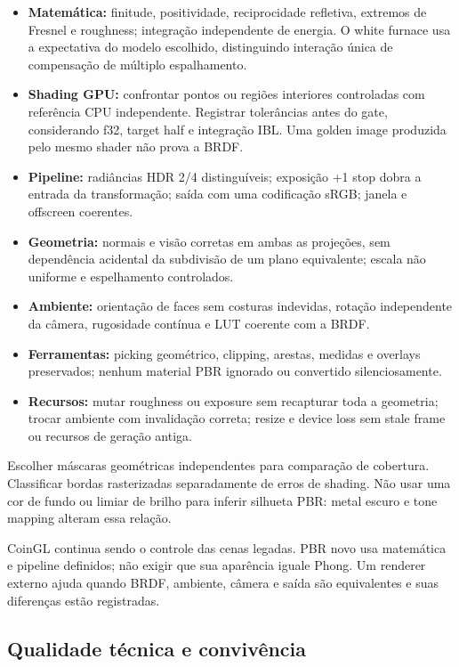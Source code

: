 \documentclass[11pt,a4paper]{article}
\begin{document}
\begin{itemize}
\item \textbf{Matemática:} finitude, positividade, reciprocidade refletiva, extremos de Fresnel e roughness; integração independente de energia. O white furnace usa a expectativa do modelo escolhido, distinguindo interação única de compensação de múltiplo espalhamento.
\item \textbf{Shading GPU:} confrontar pontos ou regiões interiores controladas com referência CPU independente. Registrar tolerâncias antes do gate, considerando f32, target half e integração IBL. Uma golden image produzida pelo mesmo shader não prova a BRDF.
\item \textbf{Pipeline:} radiâncias HDR 2/4 distinguíveis; exposição +1 stop dobra a entrada da transformação; saída com uma codificação sRGB; janela e offscreen coerentes.
\item \textbf{Geometria:} normais e visão corretas em ambas as projeções, sem dependência acidental da subdivisão de um plano equivalente; escala não uniforme e espelhamento controlados.
\item \textbf{Ambiente:} orientação de faces sem costuras indevidas, rotação independente da câmera, rugosidade contínua e LUT coerente com a BRDF.
\item \textbf{Ferramentas:} picking geométrico, clipping, arestas, medidas e overlays preservados; nenhum material PBR ignorado ou convertido silenciosamente.
\item \textbf{Recursos:} mutar roughness ou exposure sem recapturar toda a geometria; trocar ambiente com invalidação correta; resize e device loss sem stale frame ou recursos de geração antiga.
\end{itemize}

Escolher máscaras geométricas independentes para comparação de cobertura. Classificar bordas rasterizadas separadamente de erros de shading. Não usar uma cor de fundo ou limiar de brilho para inferir silhueta PBR: metal escuro e tone mapping alteram essa relação.

CoinGL continua sendo o controle das cenas legadas. PBR novo usa matemática e pipeline definidos; não exigir que sua aparência iguale Phong. Um renderer externo ajuda quando BRDF, ambiente, câmera e saída são equivalentes e suas diferenças estão registradas.

\subsection{Qualidade técnica e convivência}
\end{document}
